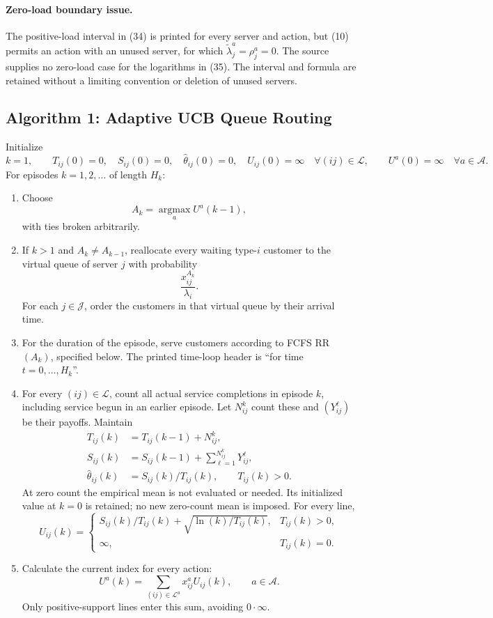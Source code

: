 \documentclass{article}
\begin{document}
\paragraph{Zero-load boundary issue.}
The positive-load interval in (34) is printed for every server and action, but (10) permits an action with an unused server, for which $\widetilde\lambda^a_j=\rho^a_j=0$. The source supplies no zero-load case for the logarithms in (35). The interval and formula are retained without a limiting convention or deletion of unused servers.

\subsection*{Algorithm 1: Adaptive UCB Queue Routing}

Initialize
\[
k=1,\qquad
T_{ij}(0)=0,\quad S_{ij}(0)=0,\quad\widehat\theta_{ij}(0)=0,\quad U_{ij}(0)=\infty
\quad\forall(ij)\in\mathcal L,
\qquad U^a(0)=\infty\quad\forall a\in\mathcal A.
\]
For episodes $k=1,2,\ldots$ of length $H_k$:
\begin{enumerate}
\item Choose
\[
A_k=\operatorname*{argmax}_{a}U^a(k-1),
\]
with ties broken arbitrarily.
\item If $k>1$ and $A_k\ne A_{k-1}$, reallocate every waiting type-$i$ customer to the virtual queue of server $j$ with probability
\[
\frac{x^{A_k}_{ij}}{\lambda_i}.
\]
For each $j\in\mathcal J$, order the customers in that virtual queue by their arrival time.
\item For the duration of the episode, serve customers according to FCFS RR$(A_k)$, specified below. The printed time-loop header is ``for time $t=0,\ldots,H_k$''.
\item For every $(ij)\in\mathcal L$, count all actual service
completions in episode $k$, including service begun in an earlier episode.
Let $N^k_{ij}$ count these and $(Y^\ell_{ij})$ be their payoffs. Maintain
\begin{align}
T_{ij}(k)&=T_{ij}(k-1)+N^k_{ij},\tag{30}\\
S_{ij}(k)&=S_{ij}(k-1)+\sum_{\ell=1}^{N^k_{ij}}Y^\ell_{ij},\\
\widehat\theta_{ij}(k)&=S_{ij}(k)/T_{ij}(k),\qquad T_{ij}(k)>0.\tag{31}
\end{align}
At zero count the empirical mean is not evaluated or needed. Its initialized
value at $k=0$ is retained; no new zero-count mean is imposed. For every line,
\begin{equation}
U_{ij}(k)=\begin{cases}
S_{ij}(k)/T_{ij}(k)+\sqrt{\ln(k)/T_{ij}(k)},&T_{ij}(k)>0,\\
\infty,&T_{ij}(k)=0.
\end{cases}\tag{32}
\end{equation}
\item Calculate the current index for every action:
\begin{equation}
U^a(k)=\sum_{(ij)\in\mathcal L^a}x^a_{ij}U_{ij}(k),\qquad a\in\mathcal A.\tag{33}
\end{equation}
Only positive-support lines enter this sum, avoiding $0\cdot\infty$.
\end{enumerate}
\end{document}
